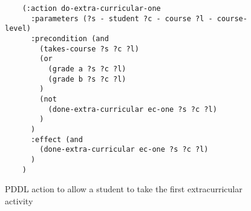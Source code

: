 \begin{figure}[t]
    \begin{lstlisting}
    (:action do-extra-curricular-one
      :parameters (?s - student ?c - course ?l - course-level)
      :precondition (and 
        (takes-course ?s ?c ?l)
        (or
          (grade a ?s ?c ?l)
          (grade b ?s ?c ?l)
        )
        (not
          (done-extra-curricular ec-one ?s ?c ?l)
        )
      )
      :effect (and 
        (done-extra-curricular ec-one ?s ?c ?l)
      )
    )
    \end{lstlisting}
    \caption{PDDL action to allow a student to take the first extracurricular activity}\label{fig:pddl-action-extra-curricular-one}
\end{figure}